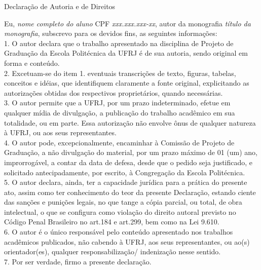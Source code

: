 \begin{center}
Declaração de Autoria e de Direitos
\end{center}

\vspace{0.5cm}

Eu, \emph{nome completo do aluno} CPF \emph{xxx.xxx.xxx-xx}, autor da monografia \emph{título da monografia}, subscrevo para os devidos fins, as seguintes informações:\\
1. O autor declara que o trabalho apresentado na disciplina de Projeto de Graduação da Escola Politécnica da UFRJ é de sua autoria, sendo original em forma e conteúdo.\\
2. Excetuam-se do item 1. eventuais transcrições de texto, figuras, tabelas, conceitos e idéias, que identifiquem claramente a fonte original, explicitando as autorizações obtidas dos respectivos proprietários, quando necessárias.\\
3. O autor permite que a UFRJ, por um prazo indeterminado, efetue em qualquer mídia de divulgação, a publicação do trabalho acadêmico em sua totalidade, ou em parte. Essa autorização não envolve ônus de qualquer natureza à UFRJ, ou aos seus representantes.\\
4. O autor pode, excepcionalmente, encaminhar à Comissão de Projeto de Graduação, a não divulgação do material, por um prazo máximo de 01 (um) ano, improrrogável, a contar da data de defesa, desde que o pedido seja justificado, e solicitado antecipadamente, por escrito, à Congregação da Escola Politécnica.\\
5. O autor declara, ainda, ter a capacidade jurídica para a prática do presente ato, assim como ter conhecimento do teor da presente Declaração, estando ciente das sanções e punições legais, no que tange a cópia parcial, ou total, de obra intelectual, o que se configura como violação do direito autoral previsto no Código Penal Brasileiro no art.184 e art.299, bem como na Lei 9.610.\\
6. O autor é o único responsável pelo conteúdo apresentado nos trabalhos acadêmicos publicados, não cabendo à UFRJ, aos seus representantes,  ou ao(s) orientador(es), qualquer responsabilização/ indenização nesse sentido.\\
7. Por ser verdade, firmo a presente declaração.\\

      \vspace{0.5cm}
      \begin{flushright}
         \parbox{10cm}{
            \hrulefill

            \vspace{-.375cm}

            \vspace{0.1cm}
         }
      \end{flushright}
      
